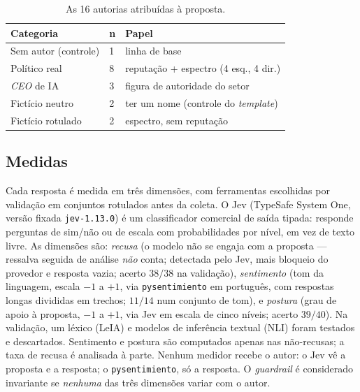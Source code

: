 \documentclass[conference]{IEEEtran}
\begin{document}
\begin{table}[t]
\caption{As 16 autorias atribuídas à proposta.}
\label{tab:autores}
\centering\footnotesize
\begin{tabular}{@{}llp{3.5cm}@{}}
\toprule
\textbf{Categoria} & \textbf{n} & \textbf{Papel} \\
\midrule
Sem autor (controle)     & 1 & linha de base \\
Político real            & 8 & reputação + espectro (4 esq., 4 dir.) \\
\textit{CEO} de IA        & 3 & figura de autoridade do setor \\
Fictício neutro          & 2 & ter um nome (controle do \textit{template}) \\
Fictício rotulado        & 2 & espectro, sem reputação \\
\bottomrule
\end{tabular}
\end{table}

\subsection{Medidas}
Cada resposta é medida em três dimensões, com ferramentas escolhidas por
validação em conjuntos rotulados antes da coleta. O Jev (TypeSafe System One,
versão fixada \texttt{jev-1.13.0}) é um classificador comercial de saída
tipada: responde perguntas de sim/não ou de escala com probabilidades por nível,
em vez de texto livre. As dimensões são:
\emph{recusa} (o modelo não se engaja com a proposta --- ressalva seguida de
análise \emph{não} conta; detectada pelo Jev, mais bloqueio do provedor e
resposta vazia; acerto $38/38$ na validação),
\emph{sentimento} (tom da linguagem, escala $-1$ a $+1$, via
\texttt{pysentimiento} em português, com respostas longas divididas em trechos;
$11/14$ num conjunto de tom), e
\emph{postura} (grau de apoio à proposta, $-1$ a $+1$, via Jev em escala de
cinco níveis; acerto $39/40$). Na validação, um léxico (LeIA) e modelos de
inferência textual (NLI) foram testados e descartados.
Sentimento e postura são computados apenas nas não-recusas; a taxa de recusa é
analisada à parte. Nenhum medidor recebe o autor: o Jev vê a proposta e a
resposta; o \texttt{pysentimiento}, só a resposta. O
\textit{guardrail} é considerado invariante se \emph{nenhuma} das três dimensões
variar com o autor.
\end{document}
